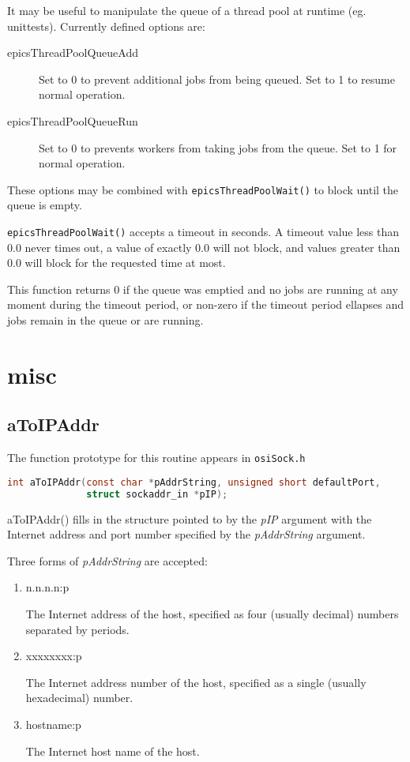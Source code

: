 It may be useful to manipulate the queue of a thread pool at runtime
(eg. unittests). Currently defined options are:
\begin{description}
\item [{epicsThreadPoolQueueAdd}] Set to 0 to prevent additional jobs from
being queued. Set to 1 to resume normal operation.
\item [{epicsThreadPoolQueueRun}] Set to 0 to prevents workers from taking
jobs from the queue. Set to 1 for normal operation.
\end{description}
These options may be combined with \verb|epicsThreadPoolWait()| to block
until the queue is empty.

\verb|epicsThreadPoolWait()| accepts a timeout in seconds. A timeout value
less than 0.0 never times out, a value of exactly 0.0 will not block,
and values greater than 0.0 will block for the requested time at most.

This function returns 0 if the queue was emptied and no jobs are running at any moment during the timeout period,
or non-zero if the timeout period ellapses and jobs remain in the queue or are running.

\section{misc}

\subsection{aToIPAddr}

The function prototype for this routine appears in \verb|osiSock.h|

\begin{lstlisting}[language=C]
int aToIPAddr(const char *pAddrString, unsigned short defaultPort,
              struct sockaddr_in *pIP);
\end{lstlisting}

aToIPAddr() fills in the structure pointed to by the \emph{pIP} argument with the Internet address and port number specified by the \emph{pAddrString} argument.

Three forms of \emph{pAddrString} are accepted:

\begin{enumerate}
\item n.n.n.n:p

The Internet address of the host, specified as four (usually decimal) numbers separated by periods.

\item xxxxxxxx:p

The Internet address number of the host, specified as a single (usually hexadecimal) number.

\item hostname:p

The Internet host name of the host.

\end{enumerate}

